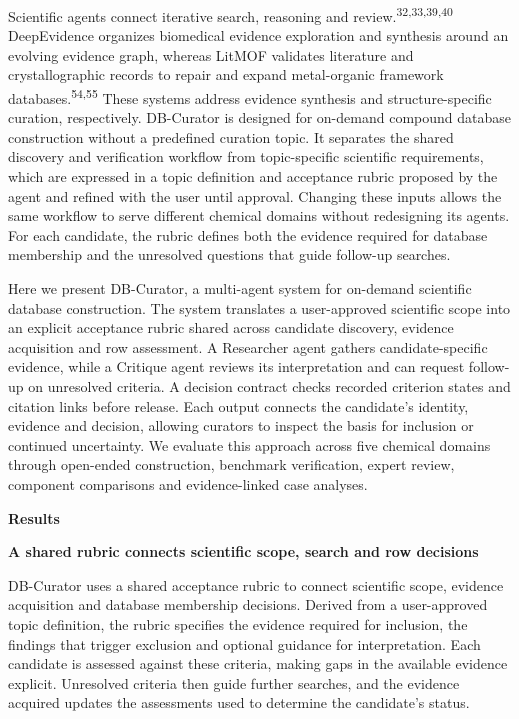 \documentclass[
]{article}
\begin{document}
Scientific agents connect iterative search, reasoning and review.\textsuperscript{32,33,39,40} DeepEvidence organizes biomedical evidence exploration and synthesis around an evolving evidence graph, whereas LitMOF validates literature and crystallographic records to repair and expand metal-organic framework databases.\textsuperscript{54,55} These systems address evidence synthesis and structure-specific curation, respectively. DB-Curator is designed for on-demand compound database construction without a predefined curation topic. It separates the shared discovery and verification workflow from topic-specific scientific requirements, which are expressed in a topic definition and acceptance rubric proposed by the agent and refined with the user until approval. Changing these inputs allows the same workflow to serve different chemical domains without redesigning its agents. For each candidate, the rubric defines both the evidence required for database membership and the unresolved questions that guide follow-up searches.

Here we present DB-Curator, a multi-agent system for on-demand scientific database construction. The system translates a user-approved scientific scope into an explicit acceptance rubric shared across candidate discovery, evidence acquisition and row assessment. A Researcher agent gathers candidate-specific evidence, while a Critique agent reviews its interpretation and can request follow-up on unresolved criteria. A decision contract checks recorded criterion states and citation links before release. Each output connects the candidate's identity, evidence and decision, allowing curators to inspect the basis for inclusion or continued uncertainty. We evaluate this approach across five chemical domains through open-ended construction, benchmark verification, expert review, component comparisons and evidence-linked case analyses.

\textbf{Results}

\textbf{A shared rubric connects scientific scope, search and row decisions}

DB-Curator uses a shared acceptance rubric to connect scientific scope, evidence acquisition and database membership decisions. Derived from a user-approved topic definition, the rubric specifies the evidence required for inclusion, the findings that trigger exclusion and optional guidance for interpretation. Each candidate is assessed against these criteria, making gaps in the available evidence explicit. Unresolved criteria then guide further searches, and the evidence acquired updates the assessments used to determine the candidate's status.
\end{document}
